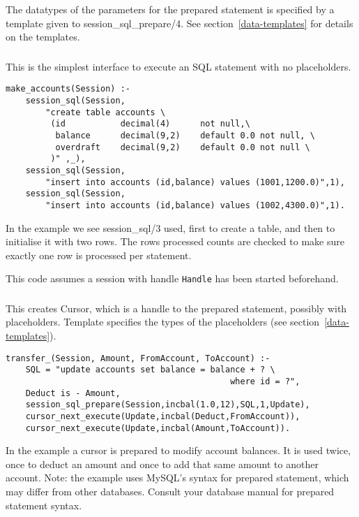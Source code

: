 The datatypes of the parameters for the prepared statement is specified by
a template given to session_sql_prepare/4. See section~\ref{data-templates}
for details on the templates.  

\subsubsection{}
\label{session-sql/3}

This is the simplest interface to execute an SQL statement with no
placeholders.

\begin{verbatim}
make_accounts(Session) :-
    session_sql(Session,
        "create table accounts \
         (id           decimal(4)      not null,\
          balance      decimal(9,2)    default 0.0 not null, \
          overdraft    decimal(9,2)    default 0.0 not null \
         )" ,_),
    session_sql(Session,
        "insert into accounts (id,balance) values (1001,1200.0)",1),
    session_sql(Session,
        "insert into accounts (id,balance) values (1002,4300.0)",1).
\end{verbatim}
In the example we see session_sql/3 used, first to create a
table, and then to initialise it with two rows. The rows processed counts
are checked to make sure exactly one row is processed per statement.

This code assumes a session with handle {\tt Handle} has been started beforehand.

\subsubsection{}
\label{session-sql-prepare/4}

This creates Cursor, which is a handle to the prepared statement,
possibly with placeholders. Template specifies the types of the placeholders 
(see section~\ref{data-templates}). 

\begin{verbatim}
transfer_(Session, Amount, FromAccount, ToAccount) :-
    SQL = "update accounts set balance = balance + ? \
                                             where id = ?",
    Deduct is - Amount,
    session_sql_prepare(Session,incbal(1.0,12),SQL,1,Update),
    cursor_next_execute(Update,incbal(Deduct,FromAccount)),
    cursor_next_execute(Update,incbal(Amount,ToAccount)).
\end{verbatim}
In the example a cursor is prepared to modify account balances. It is used
twice, once to deduct an amount and once to add that same amount to
another account. Note: the example uses MySQL's syntax for prepared
statement, which may differ from other databases. Consult your database manual for
prepared statement syntax.

